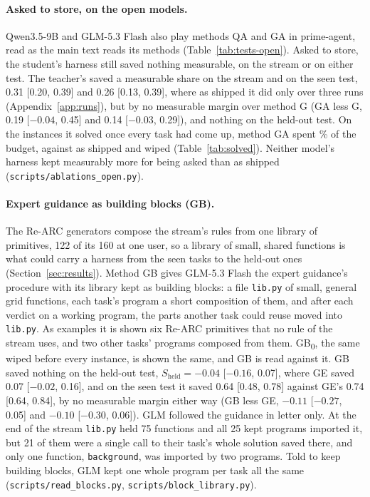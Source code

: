 \paragraph{Asked to store, on the open models.}
Qwen3.5-9B and GLM-5.3 Flash also play methods QA and GA in prime-agent, read as the main text reads its methods (Table~\ref{tab:tests-open}). Asked to store, the student's harness still saved nothing measurable, on the stream or on either test. The teacher's saved a measurable share on the stream and on the seen test, 0.31 [0.20, 0.39] and 0.26 [0.13, 0.39], where as shipped it did only over three runs (Appendix~\ref{app:runs}), but by no measurable margin over method G (GA less G, 0.19 [$-0.04$, 0.45] and 0.14 [$-0.03$, 0.29]), and nothing on the held-out test. On the instances it solved once every task had come up, method GA spent \sbGlmHaCost{}\% of the budget, against \sbGlmHCost{} as shipped and \sbGlmHzeroCost{} wiped (Table~\ref{tab:solved}). Neither model's harness kept measurably more for being asked than as shipped (\texttt{scripts/ablations\_open.py}).

\paragraph{Expert guidance as building blocks (GB).}
\label{app:blocks}
The Re-ARC generators compose the stream's rules from one library of primitives, 122 of its 160 at one user, so a library of small, shared functions is what could carry a harness from the seen tasks to the held-out ones (Section~\ref{sec:results}). Method GB gives GLM-5.3 Flash the expert guidance's procedure with its library kept as building blocks: a file \texttt{lib.py} of small, general grid functions, each task's program a short composition of them, and after each verdict on a working program, the parts another task could reuse moved into \texttt{lib.py}. As examples it is shown six Re-ARC primitives that no rule of the stream uses, and two other tasks' programs composed from them. GB\textsubscript{0}, the same wiped before every instance, is shown the same, and GB is read against it. GB saved nothing on the held-out test, $S_{\mathrm{held}} = -0.04$ [$-0.16$, 0.07], where GE saved 0.07 [$-0.02$, 0.16], and on the seen test it saved 0.64 [0.48, 0.78] against GE's 0.74 [0.64, 0.84], by no measurable margin either way (GB less GE, $-0.11$ [$-0.27$, 0.05] and $-0.10$ [$-0.30$, 0.06]). GLM followed the guidance in letter only. At the end of the stream \texttt{lib.py} held 75 functions and all 25 kept programs imported it, but 21 of them were a single call to their task's whole solution saved there, and only one function, \texttt{background}, was imported by two programs. Told to keep building blocks, GLM kept one whole program per task all the same (\texttt{scripts/read\_blocks.py}, \texttt{scripts/block\_library.py}).

